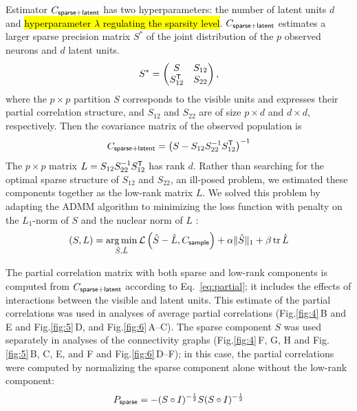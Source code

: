 \documentclass[10pt]{article}
\DeclareMathOperator{\Tr}{tr}
\newcommand{\figref}[2]{Fig.\;\ref{fig:#1}\,#2}
\newcommand{\loss}[1]{\mathcal L\left(#1\right)}
\newcommand{\T}{{\sf T}}
\DeclareMathOperator*{\argmin}{arg\,min}
\begin{document}
Estimator $C_{\sf sparse+latent}$ has two hyperparameters: the number of latent units $d$ and \hl{hyperparameter $\lambda$ regulating the sparsity level}. $C_{\sf sparse+latent}$ estimates a larger sparse precision matrix $S^\ast$ of the joint distribution of the $p$ observed neurons and $d$ latent units.  
\begin{equation}
S^\ast=
\begin{pmatrix}
S & S_{12} \\
S_{12}^\T & S_{22}
\end{pmatrix},
\end{equation}
where the $p\times p$ partition $S$ corresponds to the visible units and expresses their partial correlation structure, and $S_{12}$ and $S_{22}$ are of size $p\times d$ and $d\times d$, respectively. 
Then the covariance matrix of the observed population is 
\begin{equation}
C_{\sf sparse+latent} = \left(S-S_{12}S_{22}^{-1}S_{12}^\T\right)^{-1}
\end{equation}
The $p\times p$  matrix $L=S_{12}S_{22}^{-1}S_{12}^\T$ has rank $d$. Rather than searching for the optimal sparse structure of $S_{12}$ and $S_{22}$, an ill-posed problem, we estimated these components together as the low-rank matrix $L$. We solved this problem by adapting the ADMM algorithm to minimizing the loss function with penalty on the $L_1$-norm  of $S$ and the nuclear norm of $L$ \cite{Chandrasekaran:2010,Ma:2013}:
\begin{equation}
(S,L) = \argmin\limits_{\hat S,\hat L} \loss{\hat S-\hat L, C_{\sf sample}} + \alpha\|\hat S\|_1 + \beta \Tr{\hat L}
\end{equation}

The partial correlation matrix with both sparse and low-rank components is computed from $C_{\sf sparse+latent}$ according to Eq.~\ref{eq:partial}; it includes the effects of interactions between the visible and latent units.  This estimate of the partial correlations was used in analyses of average partial correlations (\figref{4}{B and E} and \figref{5}{D}, and \figref{6}{A--C}).  The sparse component $S$ was used separately in analyses of the connectivity graphs (\figref{4}{F, G, H} and \figref{5}{B, C, E, and F} and \figref{6}{D--F}); in this case, the partial correlations were computed by normalizing the sparse component alone without the low-rank component: 
\begin{equation}
P_{\sf sparse} = -(S\circ I)^{-\frac 1 2} S  (S\circ I)^{-\frac 1 2}
\end{equation}
\end{document}
